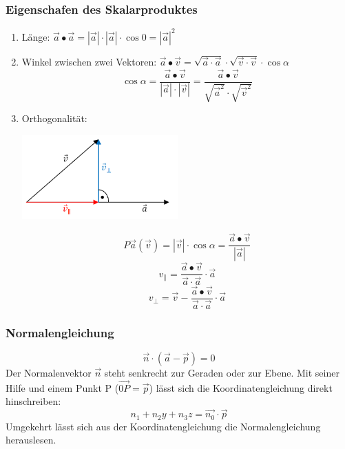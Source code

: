 	\subsubsection{Eigenschafen des Skalarproduktes}
		\begin{enumerate}
			\item Länge: $\vec{a} \bullet \vec{a} = |\vec{a}|\cdot |\vec{a}| \cdot \cos0 = |\vec{a}|^2$
			\item Winkel zwischen zwei Vektoren: $\vec{a} \bullet \vec{v} = \sqrt{\vec{a}\cdot \vec{a}} \cdot \sqrt{\vec{v} \cdot \vec{v}} \cdot \cos\alpha$\\
				\begin{equation*}
					\cos\alpha = \frac{\vec{a}\bullet \vec{v}}{|\vec{a}| \cdot |\vec{v}|} = \frac{\vec{a}\bullet \vec{v}}{\sqrt{\vec{a}^2} \cdot \sqrt{\vec{v}^2}}
				\end{equation*}
			\item Orthogonalität: \\
				\begin{minipage}{6cm}
					\includegraphics[width=6cm]{pics/1_Projektion.png}
				\end{minipage}
				\begin{minipage}[c]{8cm}
					\begin{equation*} P\vec{a}(\vec{v}) = |\vec{v}|\cdot \cos\alpha = \frac{\vec{a}\bullet \vec{v}}{|\vec{a}|}\end{equation*}
					\begin{equation*} v_{\parallel} = \frac{\vec{a}\bullet \vec{v}}{\vec{a}\cdot \vec{a}}\cdot \vec{a}\end{equation*}
					\begin{equation*} v_{\perp} = \vec{v} - \frac{\vec{a}\bullet \vec{v}}{\vec{a}\cdot \vec{a}}\cdot \vec{a}\end{equation*}
				\end{minipage}
		\end{enumerate}

	\subsubsection{Normalengleichung}
		\begin{equation*}
			\vec{n} \cdot (\vec{a} - \vec{p}) = 0
		\end{equation*}
		Der Normalenvektor $\vec{n}$ steht senkrecht zur Geraden oder zur Ebene. Mit seiner Hilfe und einem Punkt P ($\vec{0P} = \vec{p}$) lässt sich
		die Koordinatengleichung direkt hinschreiben:
		\begin{equation*}
			n_1 + n_2y + n_3z = \vec{n_0} \cdot \vec{p}
		\end{equation*}
		Umgekehrt lässt sich aus der Koordinatengleichung die Normalengleichung herauslesen. \\

